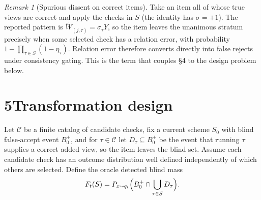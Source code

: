 \documentclass[11pt]{article}
\theoremstyle{remark}
\newtheorem*{remark}{Remark}
\begin{document}
\begin{remark}[Spurious dissent on correct items]
Take an item all of whose true views are correct and apply the checks in $S$ (the identity has $\sigma=+1$). The reported pattern is $\widetilde W_{(j,\tau)}=\sigma_\tau Y$, so the item leaves the unanimous stratum precisely when some selected check has a relation error, with probability $1-\prod_{\tau\in S}(1-\eta_\tau)$. Relation error therefore converts directly into false rejects under consistency gating. This is the term that couples \S4 to the design problem below.
\end{remark}

\section*{5\quad Transformation design}

Let $\mathcal{C}$ be a finite catalog of candidate checks, fix a current scheme $S_0$ with blind false-accept event $B_0^+$, and for $\tau\in\mathcal{C}$ let $D_\tau\subseteq B_0^+$ be the event that running $\tau$ supplies a correct added view, so the item leaves the blind set. Assume each candidate check has an outcome distribution well defined independently of which others are selected. Define the oracle detected blind mass
\[
F_t(S)=P_{x\sim q_t}\Bigl(B_0^+\cap\bigcup_{\tau\in S}D_\tau\Bigr).
\]
\end{document}
